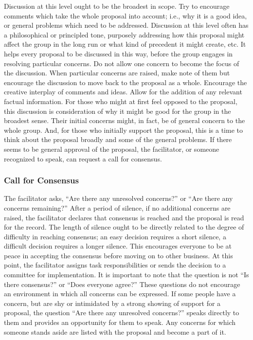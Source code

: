 Discussion at this level ought to be the broadest in scope. Try to
encourage comments which take the whole proposal into account;
i.e., why it is a good idea, or general problems which need to be
addressed. Discussion at this level often has a philosophical or
principled tone, purposely addressing how this proposal might
affect the group in the long run or what kind of precedent it might
create, etc. It helps every proposal to be discussed in this way,
before the group engages in resolving particular concerns. Do not
allow one concern to become the focus of the discussion. When
particular concerns are raised, make note of them but encourage the
discussion to move back to the proposal as a whole. Encourage the
creative interplay of comments and ideas. Allow for the addition of
any relevant factual information. For those who might at first feel
opposed to the proposal, this discussion is consideration of why it
might be good for the group in the broadest sense. Their initial
concerns might, in fact, be of general concern to the whole
group. And, for those who initially support the proposal, this is a
time to think about the proposal broadly and some of the general
problems. If there seems to be general approval of the proposal,
the facilitator, or someone recognized to speak, can request a call
for consensus.

\subsubsection*{Call for Consensus}

The facilitator asks, ``Are there any unresolved concerns?'' or ``Are
there any concerns remaining?'' After a period of silence, if no
additional concerns are raised, the facilitator declares that
consensus is reached and the proposal is read for the record. The
length of silence ought to be directly related to the degree of
difficulty in reaching consensus; an easy decision requires a short
silence, a difficult decision requires a longer silence.  This
encourages everyone to be at peace in accepting the consensus
before moving on to other business. At this point, the facilitator
assigns task responsibilities or sends the decision to a committee
for implementation.  It is important to note that the question is
not ``Is there consensus?'' or ``Does everyone agree?'' These
questions do not encourage an environment in which all concerns can
be expressed. If some people have a concern, but are shy or
intimidated by a strong showing of support for a proposal, the
question ``Are there any unresolved concerns?'' speaks directly to
them and provides an opportunity for them to speak. Any concerns
for which someone stands aside are listed with the proposal and
become a part of it.

